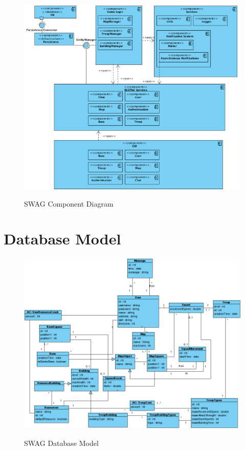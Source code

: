 \documentclass[a4paper]{article}
\begin{document}
\begin{figure}[ht!]
  \begin{center}
  \hspace*{-90pt}
  \includegraphics[scale=0.60]{fig/components.png}
  \label{fig:component_diagram}
  \caption{SWAG Component Diagram}
  \end{center}
\end{figure}

\hspace*{0pt}

\clearpage


\section{Database Model}

\begin{figure}[ht!]
  \begin{center}
  \hspace*{-90pt}
  \includegraphics[scale=0.55]{fig/database_model.png}
  \label{fig:database_model}
	\caption{SWAG Database Model}
  \end{center}
\end{figure}

\hspace{0pt}

%
%
\end{document}
